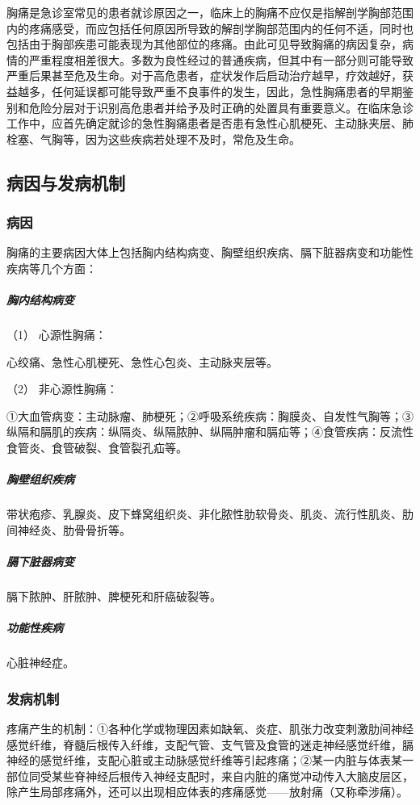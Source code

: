 胸痛是急诊室常见的患者就诊原因之一，临床上的胸痛不应仅是指解剖学胸部范围内的疼痛感受，而应包括任何原因所导致的解剖学胸部范围内的任何不适，同时也包括由于胸部疾患可能表现为其他部位的疼痛。由此可见导致胸痛的病因复杂，病情的严重程度相差很大。多数为良性经过的普通疾病，但其中有一部分则可能导致严重后果甚至危及生命。对于高危患者，症状发作后启动治疗越早，疗效越好，获益越多，任何延误都可能导致严重不良事件的发生，因此，急性胸痛患者的早期鉴别和危险分层对于识别高危患者并给予及时正确的处置具有重要意义。在临床急诊工作中，应首先确定就诊的急性胸痛患者是否患有急性心肌梗死、主动脉夹层、肺栓塞、气胸等，因为这些疾病若处理不及时，常危及生命。

\subsection{病因与发病机制}

\subsubsection{病因}

胸痛的主要病因大体上包括胸内结构病变、胸壁组织疾病、膈下脏器病变和功能性疾病等几个方面：

\subparagraph{胸内结构病变}

\hypertarget{text00022.htmlux5cux23CHP1-8-1-1-1-1}{}
（1） 心源性胸痛：

心绞痛、急性心肌梗死、急性心包炎、主动脉夹层等。

\hypertarget{text00022.htmlux5cux23CHP1-8-1-1-1-2}{}
（2） 非心源性胸痛：

①大血管病变：主动脉瘤、肺梗死；②呼吸系统疾病：胸膜炎、自发性气胸等；③纵隔和膈肌的疾病：纵隔炎、纵隔脓肿、纵隔肿瘤和膈疝等；④食管疾病：反流性食管炎、食管破裂、食管裂孔疝等。

\subparagraph{胸壁组织疾病}

带状疱疹、乳腺炎、皮下蜂窝组织炎、非化脓性肋软骨炎、肌炎、流行性肌炎、肋间神经炎、肋骨骨折等。

\subparagraph{膈下脏器病变}

膈下脓肿、肝脓肿、脾梗死和肝癌破裂等。

\subparagraph{功能性疾病}

心脏神经症。

\subsubsection{发病机制}

疼痛产生的机制：①各种化学或物理因素如缺氧、炎症、肌张力改变刺激肋间神经感觉纤维，脊髓后根传入纤维，支配气管、支气管及食管的迷走神经感觉纤维，膈神经的感觉纤维，支配心脏或主动脉感觉纤维等引起疼痛；②某一内脏与体表某一部位同受某些脊神经后根传入神经支配时，来自内脏的痛觉冲动传入大脑皮层区，除产生局部疼痛外，还可以出现相应体表的疼痛感觉------放射痛（又称牵涉痛）。

